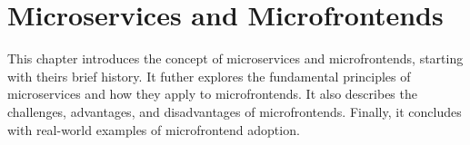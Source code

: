\chapter{Microservices and Microfrontends}
\label{chap:MicroservicesAndMicrofrontends} 
This chapter introduces the concept of microservices and microfrontends, starting with theirs brief history. It futher explores the fundamental principles of microservices and how they apply to microfrontends. It also describes the challenges, advantages, and disadvantages of microfrontends. Finally, it concludes with real-world examples of microfrontend adoption.







